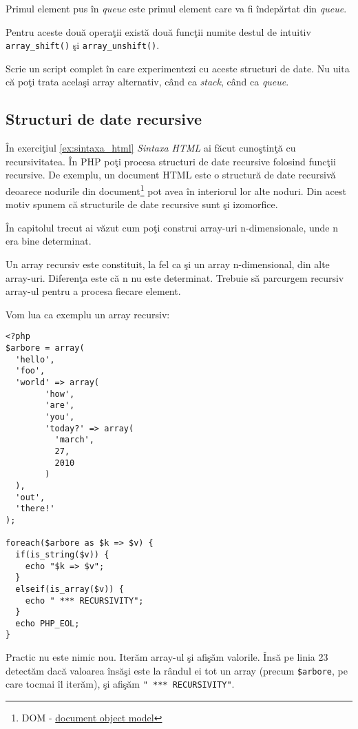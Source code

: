 Primul element pus în \textit{queue} este primul
element care va fi îndepărtat din \textsl{queue}.

Pentru aceste două operaţii există două funcţii numite
destul de intuitiv \texttt{array\_shift()} şi
\texttt{array\_unshift()}.



\begin{Exercise}[title={Experimentează cu stack şi queue}]
Scrie un script complet în care experimentezi cu
aceste structuri de date. Nu uita că poţi trata
acelaşi array alternativ, când ca \textit{stack}, când ca \textit{queue}.
\end{Exercise}

\subsection{Structuri de date recursive}
În exerciţiul \ref{ex:sintaxa_html} \textit{Sintaxa HTML} ai
făcut cunoştinţă cu recursivitatea. În PHP poţi procesa
structuri de date recursive folosind funcţii recursive.
De exemplu,
un document HTML este o structură de date recursivă
deoarece nodurile din
document\footnote{DOM - \href{http://en.wikipedia.org/wiki/Document_Object_Model}{document object model}}
pot avea în interiorul lor alte noduri. Din acest motiv
spunem că structurile de date recursive sunt şi izomorfice.

În capitolul trecut ai văzut cum poţi construi array-uri
n-dimensionale, unde n era bine determinat.

Un array recursiv este constituit, la fel ca şi un array
n-dimensional, din alte array-uri. Diferenţa este că
n nu este determinat. Trebuie să parcurgem recursiv
array-ul pentru a procesa fiecare element.


Vom lua ca exemplu un array recursiv:
\begin{lstlisting}
<?php
$arbore = array(
  'hello',
  'foo',
  'world' => array(
        'how',
        'are',
        'you',
        'today?' => array(
          'march',
          27,
          2010
        )
  ),
  'out',
  'there!'
);

foreach($arbore as $k => $v) {
  if(is_string($v)) {
	echo "$k => $v";
  }
  elseif(is_array($v)) {
	echo " *** RECURSIVITY";
  }
  echo PHP_EOL;
}
\end{lstlisting}
Practic nu este nimic nou. Iterăm array-ul şi afişăm
valorile. Însă pe linia 23 detectăm dacă valoarea însăşi
este la rândul ei tot un array (precum \texttt{\$arbore},
pe care tocmai îl iterăm), şi afişăm \texttt{" *** RECURSIVITY"}.

